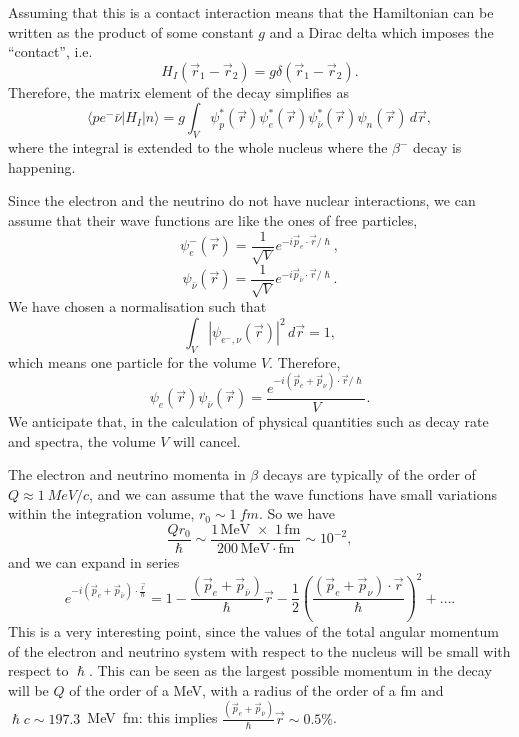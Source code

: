 Assuming that this is a contact interaction means that the Hamiltonian can be written as the product of some constant \(g\) and a Dirac delta which imposes the ``contact'', i.e.
\begin{equation*}
    H_I(\Vec{r}_1 - \Vec{r}_2) = g\delta(\Vec{r}_1 - \Vec{r}_2).
\end{equation*}
Therefore, the matrix element of the decay simplifies as
\begin{equation*}
    \langle pe^-\bar{\nu} | H_I | n \rangle = g\int_V \psi_p^*(\Vec{r})\psi_e^*(\Vec{r})\psi_{\bar{\nu}}^*(\Vec{r})\psi_n(\Vec{r})\,d\Vec{r},
\end{equation*}
where the integral is extended to the whole nucleus where the \(\beta^-\) decay is happening.

Since the electron and the neutrino do not have nuclear interactions, we can assume that their wave functions are like the ones of free particles,
\begin{equation*}
    \psi_e^{-}(\Vec{r}) = \frac{1}{\sqrt{V}}e^{-i\Vec{p}_e\cdot\Vec{r}/\hslash},
\end{equation*}
\begin{equation*}
    \psi_{\bar{\nu}}(\Vec{r}) = \frac{1}{\sqrt{V}}e^{-i\Vec{p}_{\bar{\nu}}\cdot\Vec{r}/\hslash}.
\end{equation*}
We have chosen a normalisation such that
\begin{equation*}
    \int_V |\psi_{e^-,\nu}(\Vec{r})|^2\,d\Vec{r} = 1,
\end{equation*}
which means one particle for the volume \(V\). Therefore,
\begin{equation*}
    \psi_e(\Vec{r})\psi_{\bar{\nu}}(\Vec{r}) = \frac{e^{-i(\Vec{p}_e+\Vec{p}_{\nu})\cdot \Vec{r}/\hslash}}{V}.
\end{equation*}
We anticipate that, in the calculation of physical quantities such as decay rate and spectra, the volume \(V\) will cancel.

The electron and neutrino momenta in \(\beta\) decays are typically of the order of \(Q\approx \SI{1}{MeV/c}\), and we can assume that the wave functions have small variations within the integration volume, $r_0 \sim \SI{1}{fm}$. So we have
\begin{equation*}
    \frac{Qr_0}{\hslash} \sim \frac{1\,\mbox{MeV}\,\,\times\,\,1\,\mbox{fm}}{200\,\mbox{MeV}\cdot\mbox{fm}} \sim 10^{-2},
\end{equation*}
and we can expand in series
\begin{equation*}
\label{eq:LExpansion}
    e^{-i(\Vec{p}_e+\Vec{p}_{\bar{\nu}})\cdot\frac{\Vec{r}}{\hslash}} = 1 - \frac{(\Vec{p}_e + \Vec{p}_{\bar{\nu}})}{\hslash}\Vec{r} - \frac{1}{2}\left(\frac{(\Vec{p}_e+\Vec{p}_\nu)\cdot\Vec{r}}{\hslash}\right)^2 + \dots.
\end{equation*}
This is a very interesting point, since the values of the total angular momentum of the electron and neutrino system with respect to the nucleus will be small with respect to $\hslash$. This can be seen as the largest possible momentum in the decay will be $Q$ of the order of a \si{MeV}, with a radius of the order of a \si{fm} and $\hslash c \sim 197.3$~MeV~fm: this implies $\frac{(\Vec{p}_e + \Vec{p}_{\bar{\nu}})}{\hslash}\Vec{r} 
\sim 0.5\%$.

